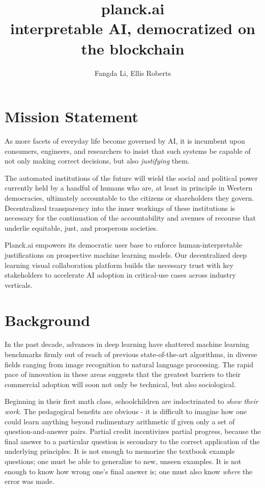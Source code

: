 \documentclass[12pt]{article}
\begin{document}
\title{planck.ai \\ \large interpretable AI, democratized on the blockchain}
\date{}
\author{Fangda Li, Ellis Roberts}
\maketitle

\tableofcontents

\section{Mission Statement}
As more facets of everyday life become governed by AI, it is incumbent upon consumers, engineers, and researchers to insist that such systems be capable of not only making correct decisions, but also \emph{justifying} them.

The automated institutions of the future will wield the social and political power currently held by a handful of humans who are, at least in principle in Western democracies, ultimately accountable to the citizens or shareholders they govern.  Decentralized transparency into the inner workings of these institutions is necessary for the continuation of the accountability and avenues of recourse that underlie equitable, just, and prosperous societies.

Planck.ai empowers its democratic user base to enforce human-interpretable justifications on prospective machine learning models.  Our decentralized deep learning visual collaboration platform builds the necessary trust with key stakeholders to accelerate AI adoption in critical-use cases across industry verticals.

\section{Background}
In the past decade, advances in deep learning have shattered machine learning benchmarks firmly out of reach of previous state-of-the-art algorithms, in diverse fields ranging from image recognition to natural language processing.  The rapid pace of innovation in these areas suggests that the greatest barriers to their commercial adoption will soon not only be technical, but also sociological.

Beginning in their first math class, schoolchildren are indoctrinated to \emph{show their work}.  The pedagogical benefits are obvious - it is difficult to imagine how one could learn anything beyond rudimentary arithmetic if given only a set of question-and-answer pairs.  Partial credit incentivizes partial progress, because the final answer to a particular question is secondary to the correct application of the underlying principles.  It is not enough to memorize the textbook example questions; one must be able to generalize to new, unseen examples.  It is not enough to know how wrong one's final answer is; one must also know \emph{where} the error was made.
\end{document}
